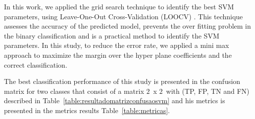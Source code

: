 \documentclass[10pt, conference, compsocconf]{IEEEtran}
\begin{document}
In this work, we applied the grid search technique \cite{gridsearchsvm2010} to identify the best SVM parameters, using Leave-One-Out Cross-Validation (LOOCV) \cite{kantardzic2011data}. This technique assesses the accuracy of the predicted model, prevents the over fitting problem in the binary classification and is a practical method to identify the SVM parameters. In this study, to reduce the error rate, we applied a mini max approach to maximize the margin over the hyper plane coefficients and the correct classification.




The best classification performance of this study is presented in the confusion matrix \cite{kantardzic2011data} for two classes that consist of a matrix $2$\ x $2$\, with (TP, FP, TN and FN) described in Table~\ref{table:resultadomatrizconfusaosvm} and his metrics is presented in the metrics results Table~\ref{table:metricas}.





\end{document}
